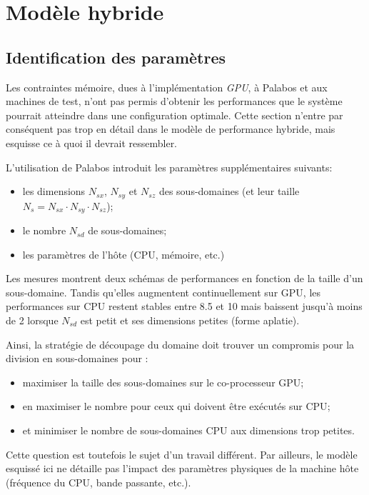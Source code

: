 \section{Modèle hybride}
\subsection{Identification des paramètres}
Les contraintes mémoire, dues à l'implémentation \textit{GPU}, à Palabos et aux machines de test, n'ont pas permis d'obtenir les performances que le système pourrait atteindre dans une configuration optimale. Cette section n'entre par conséquent pas trop en détail dans le modèle de performance hybride, mais esquisse ce à quoi il devrait ressembler. 

L'utilisation de Palabos introduit les paramètres supplémentaires suivants:
\begin{itemize}
\item les dimensions $N_{sx}$, $N_{sy}$ et $N_{sz}$ des sous-domaines (et leur taille $N_{s} = N_{sx}\cdot N_{sy}\cdot N_{sz}$);
\item le nombre $N_{sd}$ de sous-domaines;
\item les paramètres de l'hôte (\acs{CPU}, mémoire, etc.)
\end{itemize}

Les mesures montrent  deux schémas de performances en fonction de la taille d'un sous-domaine. Tandis qu’elles augmentent continuellement sur \acs{GPU}, les performances sur \acs{CPU} restent stables entre 8.5 et 10  mais baissent jusqu'à moins de 2  lorsque $N_{sd}$ est petit et ses dimensions petites (forme aplatie).

Ainsi,  la stratégie de découpage du domaine doit trouver un compromis pour la division en sous-domaines pour :
\begin{itemize}
\item maximiser la taille des sous-domaines sur le co-processeur \acs{GPU};
\item en maximiser le nombre pour ceux qui doivent être exécutés sur \acs{CPU};
\item et minimiser le nombre de sous-domaines \acs{CPU} aux dimensions trop petites.
\end{itemize}

\noindent Cette question est toutefois le sujet d'un travail différent. Par ailleurs, le modèle esquissé ici ne détaille pas l'impact des paramètres physiques de la machine hôte (fréquence du \acs{CPU}, bande passante, etc.).

